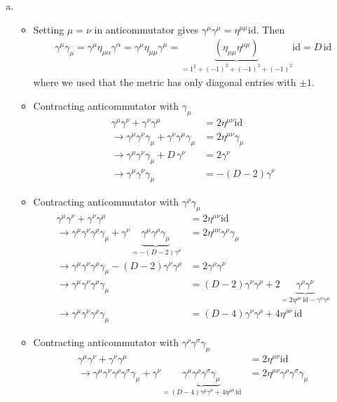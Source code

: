 \documentclass[../main.tex]{subfiles}
\begin{document}
\begin{enumerate}[a)]
\item 
\begin{itemize}
\item Setting $\mu=\nu$ in anticommutator gives $\gamma^\mu\gamma^\mu=\eta^{\mu\mu}\text{id}$. Then
\begin{align}
\gamma^\mu\gamma_\mu
=\gamma^\mu\eta_{\mu\alpha}\gamma^\alpha
=\gamma^\mu\eta_{\mu\mu}\gamma^\mu
=\underbrace{(\eta_{\mu\mu}\eta^{\mu\mu})}_{=1^2+(-1)^2+(-1)^2+(-1)^2}\text{id}
=D\,\text{id}
\end{align}
where we used that the metric has only diagonal entries with $\pm1$.
\item Contracting anticommutator with $\gamma_\mu$
\begin{align}
\gamma^\mu\gamma^\nu+\gamma^\nu\gamma^\mu&= 2\eta^{\mu\nu}\text{id}\\
\rightarrow\gamma^\mu\gamma^\nu\gamma_\mu+\gamma^\nu\gamma^\mu\gamma_\mu&= 2\eta^{\mu\nu}\gamma_\mu\\
\rightarrow\gamma^\mu\gamma^\nu\gamma_\mu+D\,\gamma^\nu&= 2\gamma^\nu\\
\rightarrow\gamma^\mu\gamma^\nu\gamma_\mu&= -(D-2)\gamma^\nu
\end{align}
\item Contracting anticommutator with $\gamma^\rho\gamma_\mu$
\begin{align}
\gamma^\mu\gamma^\nu+\gamma^\nu\gamma^\mu&= 2\eta^{\mu\nu}\text{id}\\
\rightarrow\gamma^\mu\gamma^\nu\gamma^\rho\gamma_\mu+\gamma^\nu\underbrace{\gamma^\mu\gamma^\rho\gamma_\mu}_{=-(D-2)\gamma^\rho}&= 2\eta^{\mu\nu}\gamma^\rho\gamma_\mu\\
\rightarrow\gamma^\mu\gamma^\nu\gamma^\rho\gamma_\mu-(D-2)\gamma^\nu\gamma^\rho&= 2\gamma^\rho\gamma^\nu\\
\rightarrow\gamma^\mu\gamma^\nu\gamma^\rho\gamma_\mu&=(D-2)\gamma^\nu\gamma^\rho+2\underbrace{\gamma^\rho\gamma^\nu}_{=2\eta^{\rho\nu}\,\text{id}-\gamma^\nu\gamma^\mu}\\
\rightarrow\gamma^\mu\gamma^\nu\gamma^\rho\gamma_\mu&=(D-4)\gamma^\nu\gamma^\rho+4\eta^{\rho\nu}\,\text{id}
\end{align}
\item Contracting anticommutator with $\gamma^\rho\gamma^\sigma\gamma_\mu$
\begin{align}
\gamma^\mu\gamma^\nu+\gamma^\nu\gamma^\mu&= 2\eta^{\mu\nu}\text{id}\\
\rightarrow\gamma^\mu\gamma^\nu\gamma^\rho\gamma^\sigma\gamma_\mu+\gamma^\nu\underbrace{\gamma^\mu\gamma^\rho\gamma^\sigma\gamma_\mu}_{=(D-4)\gamma^\rho\gamma^\sigma+4\eta^{\rho\sigma}\,\text{id}}&= 2\eta^{\mu\nu}\gamma^\rho\gamma^\sigma\gamma_\mu\\

\end{align}
\end{itemize}
\end{enumerate}
\end{document}
